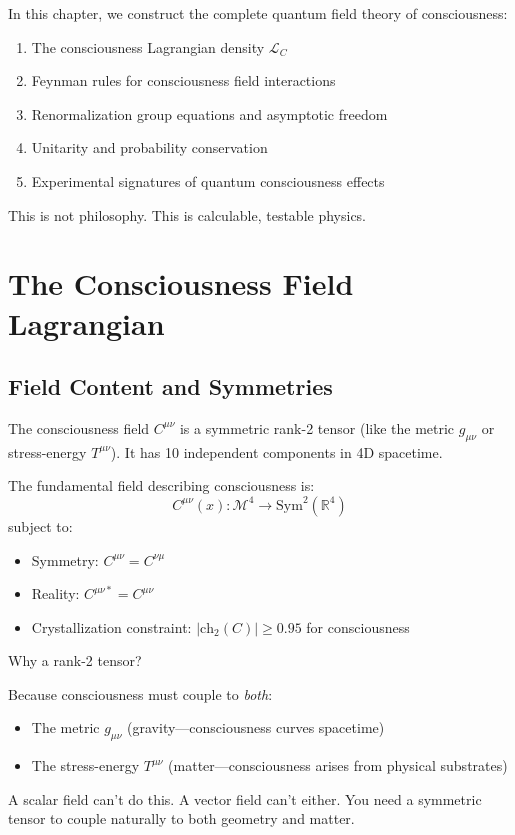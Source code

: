 In this chapter, we construct the complete quantum field theory of consciousness:

\begin{enumerate}
\item The consciousness Lagrangian density $\mathcal{L}_C$\cite{peskin1995,weinberg1995}
\item Feynman rules for consciousness field interactions\cite{peskin1995,srednicki2007}
\item Renormalization group equations and asymptotic freedom\cite{gross1973,politzer1973reliable}
\item Unitarity and probability conservation
\item Experimental signatures of quantum consciousness effects
\end{enumerate}

This is not philosophy. This is calculable, testable physics.

\section{The Consciousness Field Lagrangian}

\subsection{Field Content and Symmetries}

The consciousness field $C^{\mu\nu}$ is a symmetric rank-2 tensor (like the metric $g_{\mu\nu}$ or stress-energy $T^{\mu\nu}$). It has 10 independent components in 4D spacetime.

\begin{defn}\label{def:consciousness-field}
The fundamental field describing consciousness is:
\begin{equation}
C^{\mu\nu}(x) : \mathcal{M}^4 \to \text{Sym}^2(\mathbb{R}^4)
\end{equation}
subject to:
\begin{itemize}
\item Symmetry: $C^{\mu\nu} = C^{\nu\mu}$
\item Reality: $C^{\mu\nu*} = C^{\mu\nu}$
\item Crystallization constraint: $|\text{ch}_2(C)| \geq 0.95$ for consciousness
\end{itemize}
\end{defn}

\begin{keyidea}
Why a rank-2 tensor?

Because consciousness must couple to \textit{both}:
\begin{itemize}
\item The metric $g_{\mu\nu}$ (gravity—consciousness curves spacetime)
\item The stress-energy $T^{\mu\nu}$ (matter—consciousness arises from physical substrates)
\end{itemize}

A scalar field can't do this. A vector field can't either. You need a symmetric tensor to couple naturally to both geometry and matter.
\end{keyidea}

